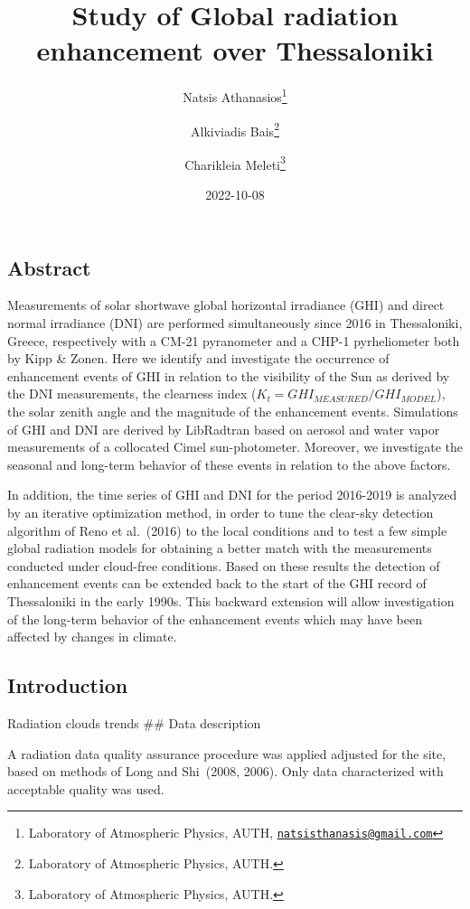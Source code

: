 \documentclass[
  11pt,
  a4paper,oneside]{article}
\title{Study of Global radiation enhancement over Thessaloniki}
\author{Natsis Athanasios\footnote{Laboratory of Atmospheric Physics, AUTH, \href{mailto:natsisthanasis@gmail.com}{\nolinkurl{natsisthanasis@gmail.com}}} \and Alkiviadis Bais\footnote{Laboratory of Atmospheric Physics, AUTH.} \and Charikleia Meleti\footnote{Laboratory of Atmospheric Physics, AUTH.}}
\date{2022-10-08}
\begin{document}
\maketitle

{
\setcounter{tocdepth}{2}
\tableofcontents
}
\hypertarget{abstract}{%
\subsection{Abstract}\label{abstract}}

Measurements of solar shortwave global horizontal irradiance (GHI) and direct normal irradiance (DNI) are performed simultaneously since 2016 in Thessaloniki, Greece, respectively with a CM-21 pyranometer and a CHP-1 pyrheliometer both by Kipp \& Zonen. Here we identify and investigate the occurrence of enhancement events of GHI in relation to the visibility of the Sun as derived by the DNI measurements, the clearness index (\(K_t = {GHI}_{MEASURED}/GHI_{MODEL}\)), the solar zenith angle and the magnitude of the enhancement events. Simulations of GHI and DNI are derived by LibRadtran based on aerosol and water vapor measurements of a collocated Cimel sun-photometer. Moreover, we investigate the seasonal and long-term behavior of these events in relation to the above factors.

In addition, the time series of GHI and DNI for the period 2016-2019 is analyzed by an iterative optimization method, in order to tune the clear-sky detection algorithm of Reno et al.~(2016) to the local conditions and to test a few simple global radiation models for obtaining a better match with the measurements conducted under cloud-free conditions. Based on these results the detection of enhancement events can be extended back to the start of the GHI record of Thessaloniki in the early 1990s. This backward extension will allow investigation of the long-term behavior of the enhancement events which may have been affected by changes in climate.

\hypertarget{introduction}{%
\subsection{Introduction}\label{introduction}}

Radiation clouds trends
\#\# Data description

A radiation data quality assurance procedure was applied adjusted for the site,
based on methods of Long and Shi~(2008, 2006).
Only data characterized with acceptable quality was used.
\end{document}

